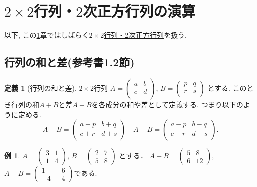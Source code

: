 \documentclass[dvipdfmx,a4paper,11pt]{article}
\theoremstyle{definition}
\newtheorem{dfn}[thm]{定義}
\newtheorem{exa}[thm]{例}
\begin{document}
\section{$2 \times 2$行列・$2$次正方行列の演算}
\label{sec-2}


以下, この\ref{sec-2}章ではしばらく\underline{$2 \times 2$行列・2次正方行列}を扱う. 

\subsection{行列の和と差(参考書1.2節)}

 \begin{tcolorbox}[
    colback = white,
    colframe = green!35!black,
    fonttitle = \bfseries,
    breakable = true]
    \begin{dfn}[行列の和と差]
    \text{}
 
$2 \times 2$行列
$
A=\begin{pmatrix}
a& b \\
c& d \\
\end{pmatrix}
$, 
$
B=\begin{pmatrix}
p& q \\
r& s\\
\end{pmatrix}
$
とする.
このとき行列の和$A+B$と差$A-B$を各成分の和や差として定義する.
つまり以下のように定める. 
$$
A+B=
\begin{pmatrix}
a +p& b +q\\
c+r& d+s \\
\end{pmatrix}
\quad
A-B=
\begin{pmatrix}
a -p& b -q\\
c-r & d-s \\
\end{pmatrix}.
$$
  \end{dfn}
 \end{tcolorbox}
 

\begin{exa}
 $A = 
 \begin{pmatrix}
 3&1 \\
 1&4
 \end{pmatrix}
 $, 
 $
 B = 
 \begin{pmatrix}
 2&7\\
 5&8
 \end{pmatrix}
 $
 とする．
$
 A+B =
 \begin{pmatrix}
 5&8 \\
6&12
 \end{pmatrix}
 $, 
 $
  A-B =
 \begin{pmatrix}
 1&-6 \\
 -4&-4
 \end{pmatrix}
 $である.
 \end{exa}
\end{document}
